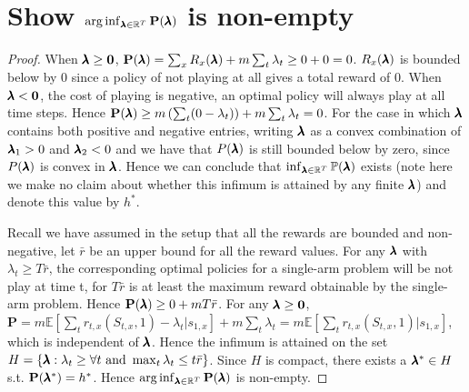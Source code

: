 \section{Show $\arg\inf_{\pmb{\lambda}\in \mathbb{R}^T}\mathbf{P}(\pmb{\lambda})$ is non-empty}\label{ap:nonemp}
\begin{proof}
When $\pmb{\lambda} \geq \mathbf{0}$, $\mathbf{P}(\pmb{\lambda})=\sum_x R_x(\pmb{\lambda}) + m\sum_t\lambda_t \geq 0+0 = 0$. $R_x(\pmb{\lambda})$ is bounded below by 0 since a policy of not playing at all gives a total reward of 0. When $\pmb{\lambda} < \mathbf{0}$, the cost of playing is negative, an optimal policy will always play at all time steps. Hence $\mathbf{P}(\pmb{\lambda})\geq m\left(\sum_t(0-\lambda_t)\right)+m\sum_t \lambda_t=0$. For the case in which $\pmb{\lambda}$ contains both positive and negative entries, writing $\pmb{\lambda}$ as a convex combination of $\pmb{\lambda}_1 > 0$ and $\pmb{\lambda}_2 < 0$ and we have that $P(\pmb{\lambda})$ is still bounded below by zero, since $P(\pmb{\lambda})$ is convex in $\pmb{\lambda}$. Hence we can conclude that $\inf_{\pmb{\lambda}\in \mathbb{R}^T}\mathbb{P}(\pmb{\lambda})$ exists (note here we make no claim about whether this infimum is attained by any finite $\pmb{\lambda}$) and denote this value by $h^*$.

Recall we have assumed in the setup that all the rewards are bounded and non-negative, let $\bar{r}$ be an upper bound for all the reward values. For any $\pmb{\lambda}$ with $\lambda_t\geq T\bar{r} $, the corresponding optimal policies for a single-arm problem will be not play at time t, for $T\bar{r}$ is at least the maximum reward obtainable by the single-arm problem. Hence $\mathbf{P}(\pmb{\lambda}) \geq 0 +  mT\bar{r}$. For any $\pmb{\lambda}\geq \mathbf{0}$, $\mathbf{P} = m\mathbb{E}[\sum_t r_{t,x}(S_{t,x},1)-\lambda_t|s_{1,x}]+m\sum_t \lambda_t=m\mathbb{E}[\sum_t r_{t,x}(S_{t,x},1)|s_{1,x}]$, which is independent of $\pmb{\lambda}$. Hence the infimum is attained on the set $H=\{\pmb{\lambda}: \lambda_t\geq \forall t \text{ and } \max_t \lambda_t\leq t\bar{r}\}$. Since $H$ is compact, there exists a $\pmb{\lambda}^* \in H$ s.t. $\mathbf{P}(\pmb{\lambda}^*)=h^*$. Hence $\arg\inf_{\pmb{\lambda}\in \mathbb{R}^T}\mathbf{P}(\pmb{\lambda})$ is non-empty.
\end{proof}
